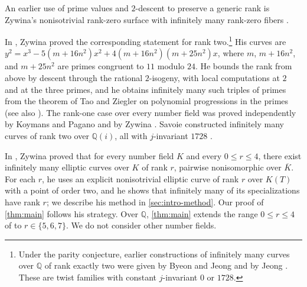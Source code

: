 \documentclass[12pt,oneside,openany]{book}
\theoremstyle{definition}
\theoremstyle{plain}
\numberwithin{equation}{chapter}
\theoremstyle{plain}
\theoremstyle{definition}
\theoremstyle{remark}
\newcommand{\Q}{\mathbb Q}
\begin{document}
An earlier use of prime values and $2$-descent to preserve a generic rank is Zywina's nonisotrivial rank-zero surface with infinitely many rank-zero fibers \cite[Theorem~1.2]{ZywinaNoJumps2025}.

In \cite{Zywina2025}, Zywina proved the corresponding statement for rank two.\footnote{Under the parity conjecture, earlier constructions of infinitely many curves over $\Q$ of rank exactly two were given by Byeon and Jeong \cite[Theorem~1.1]{ByeonJeong2016} and by Jeong \cite[Theorem~1.1]{Jeong2019}. These are twist families with constant $j$-invariant $0$ or $1728$.} His curves are $y^2=x^3-5(m+16n^2)x^2+4(m+16n^2)(m+25n^2)x$, where $m$, $m+16n^2$, and $m+25n^2$ are primes congruent to $11$ modulo $24$. He bounds the rank from above by descent through the rational $2$-isogeny, with local computations at $2$ and at the three primes, and he obtains infinitely many such triples of primes from the theorem of Tao and Ziegler on polynomial progressions in the primes \cite[Theorem~1.3]{TaoZiegler2008} (see also \cite{TaoZieglerErratum2013}). The rank-one case over every number field was proved independently by Koymans and Pagano \cite{KoymansPagano2025} and by Zywina \cite{ZywinaRankOne2025}. Savoie constructed infinitely many curves of rank two over $\Q(i)$, all with $j$-invariant $1728$ \cite{Savoie2025}.

In \cite[Theorem~1.1]{Zywina2026}, Zywina proved that for every number field $K$ and every $0\le r\le 4$, there exist infinitely many elliptic curves over $K$ of rank $r$, pairwise nonisomorphic over $\overline K$. For each $r$, he uses an explicit nonisotrivial elliptic curve of rank $r$ over $K(T)$ with a point of order two, and he shows that infinitely many of its specializations have rank $r$; we describe his method in \cref{sec:intro-method}. Our proof of \cref{thm:main} follows his strategy. Over $\Q$, \cref{thm:main} extends the range $0\le r\le 4$ of \cite[Theorem~1.1]{Zywina2026} to $r\in\{5,6,7\}$. We do not consider other number fields.
\end{document}
